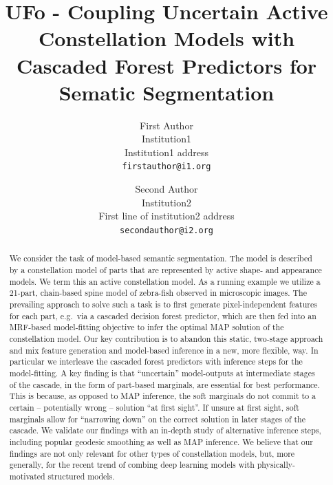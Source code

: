 \documentclass[10pt,twocolumn,letterpaper]{article}
\begin{document}
\title{UFo - Coupling Uncertain Active Constellation Models with \\
Cascaded Forest Predictors for Sematic Segmentation}

\author{First Author\\
Institution1\\
Institution1 address\\
{\tt\small firstauthor@i1.org}
\and
Second Author\\
Institution2\\
First line of institution2 address\\
{\tt\small secondauthor@i2.org}
}

\maketitle

\begin{abstract}
We consider the task of model-based semantic segmentation. The model is described by a constellation model of parts that are represented by active shape- and appearance models. We term this an active constellation model. As a running example we utilize a 21-part, chain-based spine model of zebra-fish observed in microscopic images. The prevailing approach to solve such a task is to first generate pixel-independent features for each part, e.g.\ via a cascaded decision forest predictor, which are then fed into an MRF-based model-fitting objective to infer the optimal MAP solution of the constellation model. Our key contribution is to abandon this static, two-stage approach and mix feature generation and model-based inference in a new, more flexible, way. In particular we interleave the cascaded forest predictors with inference steps for the model-fitting. A key finding is that “uncertain” model-outputs at intermediate stages of the cascade, in the form of part-based marginals, are essential for best performance. 
%
This is because, as opposed to MAP inference, the soft marginals do not commit to a certain -- potentially wrong -- solution ``at first sight''. If unsure at first sight, soft marginals allow for ``narrowing down'' on the correct solution in later stages of the cascade. 
%
We validate our findings with an in-depth study of alternative inference steps, including popular geodesic smoothing as well as MAP inference. %
We believe that our findings are not only relevant for other types of constellation models, but, more generally, for the recent trend of combing deep learning models with physically-motivated structured models. 
\end{abstract}
\end{document}
